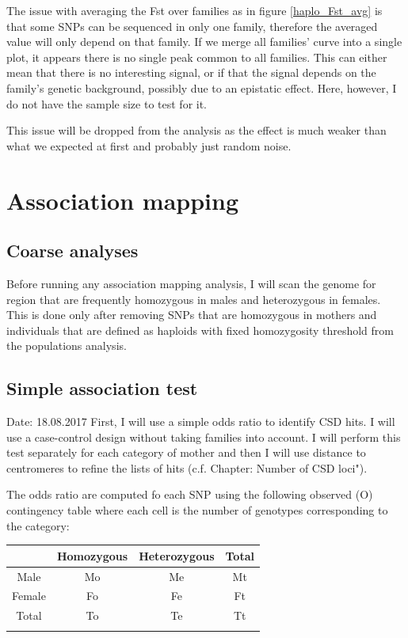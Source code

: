 \documentclass[10pt,a4paper]{report}
\begin{document}
The issue with averaging the Fst over families as in figure \ref{haplo_Fst_avg} is that some SNPs can be sequenced in only one family, therefore the averaged value will only depend on that family. If we merge all families' curve into a single plot, it appears there is no single peak common to all families. 
This can either mean that there is no interesting signal, or if that the signal depends on the family's genetic background, possibly due to an epistatic effect. Here, however, I do not have the sample size to test for it. 

This issue will be dropped from the analysis as the effect is much weaker than what we expected at first and probably just random noise.

\chapter{Association mapping}

\section{Coarse analyses}
Before running any association mapping analysis, I will scan the genome for region that are frequently homozygous in males and heterozygous in females. This is done only after removing SNPs that are homozygous in mothers and individuals that are defined as haploids with fixed homozygosity threshold from the populations analysis.

\section{Simple association test}

Date: 18.08.2017
First, I will use a simple odds ratio to identify CSD hits. I will use a case-control design without taking families into account. I will perform this test separately for each category of mother and then I will use distance to centromeres to refine the lists of hits (c.f. Chapter: Number of CSD loci").

The odds ratio are computed fo each SNP using the following observed (O) contingency table where each cell is the number of genotypes corresponding to the category:

\begin{table}[h!]
\begin{tabular}{c|c c c}
& Homozygous & Heterozygous & Total\\
\hline
Male & Mo & Me & Mt\\
Female & Fo & Fe & Ft\\
Total & To & Te & Tt\\
\vspace{5px}
\end{tabular}
\end{table}
\end{document}
